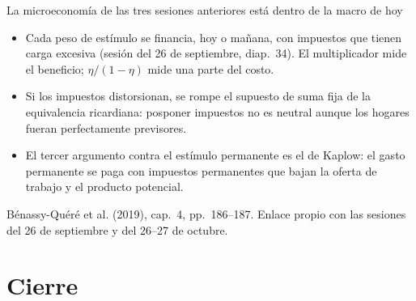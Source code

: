 \documentclass[aspectratio=169,11pt]{beamer}
\newcommand{\fuente}[1]{\par\vfill{\small\color{cGris}#1\par}}
\newcommand{\BQ}{Bénassy-Quéré et al. (2019), cap.~4}
\begin{document}
\begin{frame}{La microeconomía de las tres sesiones anteriores está dentro de la macro de hoy}
  \begin{itemize}
    \item<1-> Cada peso de estímulo se financia, hoy o mañana, con impuestos que tienen carga excesiva (sesión del 26 de septiembre, diap.~34). El multiplicador mide el beneficio; $\eta/(1-\eta)$ mide una parte del costo.
    \item<2-> Si los impuestos distorsionan, se rompe el supuesto de suma fija de la equivalencia ricardiana: posponer impuestos no es neutral aunque los hogares fueran perfectamente previsores.
    \item<3-> El tercer argumento contra el estímulo permanente es el de Kaplow: el gasto permanente se paga con impuestos permanentes que bajan la oferta de trabajo y el producto potencial.
  \end{itemize}
  \fuente{\BQ, pp.~186--187. Enlace propio con las sesiones del 26 de septiembre y del 26--27 de octubre.}
\end{frame}

\section{Cierre}
\end{document}
